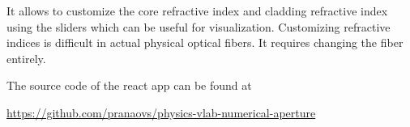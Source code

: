 \documentclass{article}
\theoremstyle{mytheoremstyle}
\theoremstyle{mytheoremstyle}
\theoremstyle{myproblemstyle}
\begin{document}
It allows to customize the core refractive index and cladding refractive index using the sliders which can be useful for visualization.
Customizing refractive indices is difficult in actual physical optical fibers. It requires changing the fiber entirely.

The source code of the react app can be found at

\url{https://github.com/pranaovs/physics-vlab-numerical-aperture}
\end{document}
